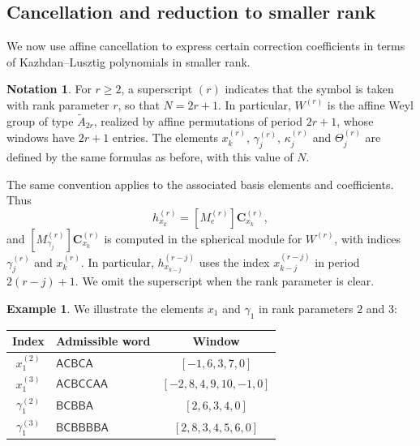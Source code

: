 \documentclass[11pt,a4paper,reqno]{amsart}
\numberwithin{equation}{section}
\theoremstyle{definition}
\newtheorem*{notation}{Notation}
\newtheorem{example}[theorem]{Example}
\theoremstyle{remark}
\theoremstyle{plain}
\newcommand{\C}{\mathbf C}
\begin{document}
\subsection{Cancellation and reduction to smaller rank}

We now use affine cancellation to express certain correction coefficients
in terms of Kazhdan--Lusztig polynomials in smaller rank. 






\begin{notation}
For $r\geq2$, a superscript $(r)$ indicates that the symbol is taken
with rank parameter $r$, so that $N=2r+1$. In particular, $W^{(r)}$
is the affine Weyl group of type $\widetilde A_{2r}$, realized by
affine permutations of period $2r+1$, whose windows have $2r+1$ entries.
The elements $x_k^{(r)}$, $\gamma_j^{(r)}$, $\kappa_j^{(r)}$ and
$\Theta_j^{(r)}$ are defined by the same formulas as before, with
this value of $N$. 

The same convention applies to the associated basis elements and
coefficients. Thus
\[
 h_{x_k}^{(r)}=[M_e^{(r)}]\C_{x_k}^{(r)},
\]
and $[M_{\gamma_j}^{(r)}]\C_{x_k}^{(r)}$ is computed in the spherical
module for $W^{(r)}$, with indices $\gamma_j^{(r)}$ and $x_k^{(r)}$.
In particular, $h_{x_{k-j}}^{(r-j)}$ uses the index
$x_{k-j}^{(r-j)}$ in period $2(r-j)+1$.
We omit the superscript when the rank parameter is clear.
\end{notation}

\begin{example}\label{ex:rank-notation}
We illustrate  the elements $x_1$ and $\gamma_1$ in rank parameters $2$ and $3$:
\begin{center}
\begin{tabular}{@{}clc@{}}
\toprule
Index & Admissible word & Window\\\midrule
$x_1^{(2)}$ & $\mathsf{ACBCA}$ & $[-1,6,3,7,0]$\\
$x_1^{(3)}$ & $\mathsf{ACBCCAA}$ & $[-2,8,4,9,10,-1,0]$\\
$\gamma_1^{(2)}$ & $\mathsf{BCBBA}$ & $[2,6,3,4,0]$\\
$\gamma_1^{(3)}$ & $\mathsf{BCBBBBA}$ & $[2,8,3,4,5,6,0]$\\\bottomrule
\end{tabular}
\end{center}

\end{example}
\end{document}
